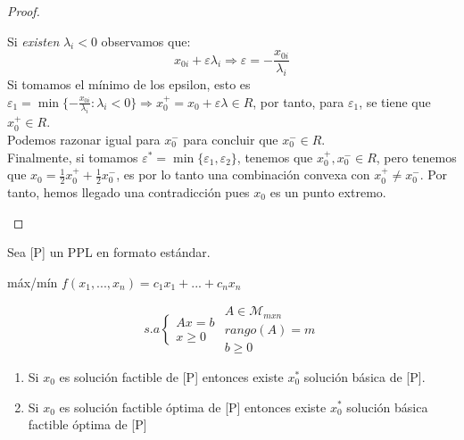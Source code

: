 \documentclass[11pt,fleqn]{book} %
\begin{document}
\begin{proof}
\begin{enumerate}
$$		$$
		 Si \textit{existen} $\lambda_i < 0$ observamos que:
		$$
			 x_{0i}+\varepsilon\lambda_i\Rightarrow\varepsilon=-\frac{x_{0i}}{\lambda_i}
		$$
		 Si tomamos el mínimo de los epsilon, esto es $\varepsilon_1=\min\{-\frac{x_{0i}}{\lambda_i} : \lambda_i < 0\} \Rightarrow x_0^+=x_0+\varepsilon \lambda \in R$, por tanto, para $\varepsilon_1$, se tiene que $x_0^+ \in R$. \\
		 Podemos razonar igual para $x_0^-$ para concluir que $x_0^- \in R$.\\
		 Finalmente, si tomamos $\varepsilon^*=\min\{\varepsilon_1, \varepsilon_2\}$, tenemos que $x_0^+, x_0^- \in R$, pero tenemos que $x_0=\frac{1}{2}x_0^++\frac{1}{2}x_0^-$, es por lo tanto una combinación convexa con $x_0^+ \neq x_0^-$. Por tanto, hemos llegado una contradicción pues $x_0$ es un punto extremo.
	\end{enumerate}
\end{proof}
\begin{theorem}
	Sea [P] un PPL en formato estándar.
	\begin{center}
		máx/mín $f(x_1, ..., x_n)=c_1x_1+...+c_nx_n$
	\end{center}
	$$
		s.a \left\{ \begin{array}{c}
		Ax=b \\
		x\geq0
		\end{array}\right.
		\begin{array}{c}
			A\in \mathcal{M}_{mxn}\\
			rango(A)=m\\
			b\geq 0
		\end{array}
	$$
	\begin{enumerate}
		\item Si $x_0$ es solución factible de [P] entonces existe $x_0^*$ solución básica de [P].
		\item Si $x_0$ es solución factible óptima de [P] entonces existe $x_0^*$ solución básica factible óptima de [P]
	\end{enumerate}
\end{theorem}
\end{document}
